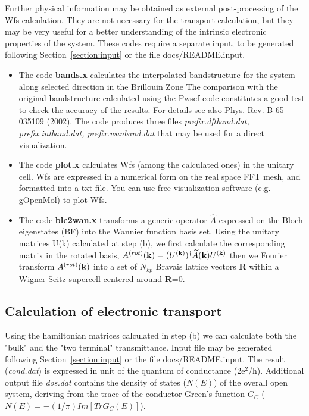 \noindent Further physical information may be obtained as external
post-processing of the Wfs calculation. They are not necessary for
the transport calculation, but they may be very useful for a
better understanding of the intrinsic electronic properties of the
system. These codes require a separate input, to be generated
following Section~\ref{section:input} or the file
docs/README.input.

\begin{itemize}
\item The code {\bf bands.x} calculates  the interpolated bandstructure
      for the system along selected direction in the Brillouin Zone
      The comparison with the original bandstructure calculated
      using the Pwscf code constitutes a good test to check the accuracy
      of the results. For details see also Phys. Rev. B 65 035109 (2002).
      The code produces three files {\em prefix.dftband.dat,
      prefix.intband.dat, prefix.wanband.dat} that
      may be used for a direct visualization.
\item The code {\bf plot.x} calculates Wfs (among the calculated ones) in the unitary
      cell. Wfs are expressed in a numerical form on the real space FFT mesh, and formatted into a txt
      file. You can use free visualization software
      (e.g. gOpenMol) to plot Wfs.
\item The code {\bf blc2wan.x} transforms a generic operator $\widehat{A}$ expressed on the Bloch
      eigenstates (BF) into the Wannier function basis set. Using the unitary
      matrices U(k) calculated at step (b), we first
      calculate the  corresponding matrix in the rotated basis,
      $A^{(rot)}({\bf k})=(U^{({\bf k})})^{\dagger}\widetilde{A}({\bf
      k})U^{({\bf k})}$ then we Fourier transform $A^{(rot)}({\bf k})$ into a set of $N_{kp}$
      Bravais lattice vectors {\bf R} within a Wigner-Seitz supercell
      centered around {\bf R}=0.
\end{itemize}



\subsection {Calculation of electronic
transport}\label{subsection:transport}

Using the hamiltonian matrices calculated in step (b) we can
calculate both the "bulk" and the "two terminal" transmittance.
Input file may be generated following Section~\ref{section:input}
or the file docs/README.input. The result ({\em cond.dat}) is
expressed in unit of the quantum of conductance (2e$^2$/h).
Additional output file {\em dos.dat} contains the density of
states ($N(E)$) of the overall open system, deriving from the
trace of the conductor Green's function $G_C$
($N(E)=-(1/\pi)Im[TrG_C(E)]$).\\

